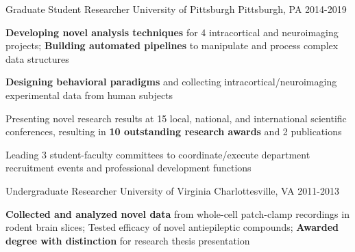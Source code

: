 \vspace*{-0.25cm}

\vspace*{0.3cm}

\begin{cventries}

\cventry
    {Graduate Student Researcher} %
    {University of Pittsburgh} %
    {Pittsburgh, PA} %
    {2014-2019} %
    {
      \begin{cvitems} %
        \item {\textbf{Developing novel analysis techniques} for 4 intracortical and neuroimaging projects; \textbf{Building automated pipelines} to manipulate and process complex data structures}
        \item {\textbf{Designing behavioral paradigms} and collecting intracortical/neuroimaging experimental data from human subjects}
        \item {Presenting novel research results at 15 local, national, and international scientific conferences, resulting in \textbf{10 outstanding research awards} and 2 publications}
        \item {Leading 3 student-faculty committees to coordinate/execute department recruitment events and professional development functions}
      \end{cvitems}
    }
    \vspace*{0.2cm}
    
\cventry
    {Undergraduate Researcher}%
    {University of Virginia}
    {Charlottesville, VA} %
    {2011-2013} %
    {
      \begin{cvitems}
      	\item {\textbf{Collected and analyzed novel data} from whole-cell patch-clamp recordings in rodent brain slices; Tested efficacy of novel antiepileptic compounds; \textbf{Awarded degree with distinction} for research thesis presentation}
      \end{cvitems}
    }
    \vspace*{0.2cm}


\end{cventries}
